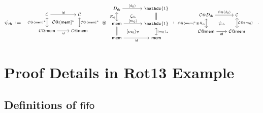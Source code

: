 \documentclass[acmsmall,nonacm]{acmart}
\newcommand{\kw}[1]{\ensuremath{ \mathsf{#1} }}
\newcommand{\sepconj}{\oast}
\newcommand{\mathbbm}[1]{\mathds{#1}}
\begin{document}
\[
  \psi_\kw{rb} \: := \:
{\footnotesize
  \begin{array}{c}
    \begin{tikzcd}[row sep=0.5ex, column sep=-3.5ex]
      \mathcal{C} \ar[dd, leftrightarrow, "\mathcal{C} @ \langle\kw{mem}{]}^*"']
      \ar[rr, "\kw{id}"]
       &&
      \mathcal{C} \ar[dd, leftrightarrow, "\mathcal{C} @ \langle\kw{mem}{]}^*"] \\
      & \mathcal{C} @ \langle \kw{mem} ]^* & \\
      \mathcal{C} @ \kw{mem} \ar[rr, "\kw{id}"']  && \mathcal{C} @ \kw{mem}
    \end{tikzcd}
  \end{array}
  \!\!
  \sepconj
  \!\!
  \begin{array}{c}
    \begin{tikzcd}[row sep=0ex, column sep=0.5ex]
      D_\kw{rb} \ar[dd, leftrightarrow, "R_\kw{rb}"']
      \ar[rr, "{[}d_0\rangle"] &&
      \mathbbm{1} \ar[dd, equal] \\
      & \zeta_\kw{rb} & \\
      \kw{mem}\ar[rr, "{[}m_0\rangle"]\ar[dd, equal]  && \mathbbm{1}
      \ar[dd, leftrightarrow, "{[} m_0\rangle_*"] \\
      & {[m_0 \rangle_\triangledown} & \\
      \kw{mem}\ar[rr, "\kw{id}"']  && \kw{mem}
    \end{tikzcd}
  \end{array}
  \!\! : \!\!
  \begin{array}{c}
    \begin{tikzcd}[row sep=0.5ex, column sep=0ex]
      \mathcal{C} @ D_\kw{rb} \ar[dd, leftrightarrow,
      "\mathcal{C} @ \langle\kw{mem}{]}^* \sepconj R_\kw{rb}"']
      \ar[rr, "\mathcal{C} @ {[}d_0 \rangle"]
       &&
      \mathcal{C} \ar[dd, leftrightarrow, "\mathcal{C} @ \langle m_0 \rangle"] \\
      & \psi_\kw{rb} & \\
      \mathcal{C} @ \kw{mem} \ar[rr, "\kw{id}"']  && \mathcal{C} @ \kw{mem}
    \end{tikzcd}
  \end{array}
  }
  \,.
\]


\section{Proof Details in Rot13 Example}
\label{app:proof-rot13} %

\subsection{Definitions of \kw{fifo}}
\end{document}
